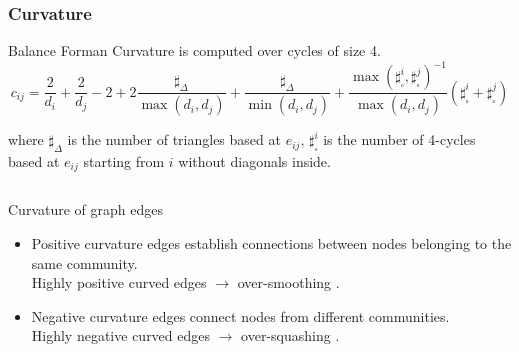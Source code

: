 \documentclass[10pt, aspectratio = 169]{beamer}
\begin{document}
\begin{frame}
    \frametitle{Curvature}
    \label{curvature}
    \small
    Balance Forman Curvature \cite[Topping, 2022]{topping2022understandingoversquashingbottlenecksgraphs} is computed over cycles of size 4.
    $$c_{ij}= \frac{2}{d_i} + \frac{2}{d_j} - 2 + 2 \frac{\sharp_{\Delta}}{\max(d_i, d_j)} + 
            \frac{\sharp_{\Delta}}{\min(d_i, d_j)} + 
            \frac{\max(\sharp_{\square}^i,\sharp_{\square}^j)^{-1}}{\max(d_i, d_j)}
            (\sharp_{\square}^i + \sharp_{\square}^j)
    $$

    {\tiny
    where $\sharp_{\Delta}$ is the number of triangles based at $e_{ij}$, 
    $\sharp_{\square}^i$ is the number of 4-cycles based at $e_{ij}$ starting from $i$
    without diagonals inside.
    }

    \begin{columns}
        \begin{column}{0.6\textwidth}
            \begin{block} {Curvature of graph edges}           
            \begin{itemize}
                \small
                \item Positive curvature edges establish connections between 
                nodes belonging to the same community.
                \\Highly positive curved edges $\rightarrow$ over-smoothing \cite[Nguyen et al., 2023]{nguyen2023revisiting}.
                
                \item Negative curvature edges connect nodes from different communities.
                \\Highly negative curved edges $\rightarrow$ over-squashing \cite[Topping et al., 2021]{topping2022understandingoversquashingbottlenecksgraphs}.
            \end{itemize}
        \end{block}


\end{column}
\end{columns}
\end{frame}
\end{document}
